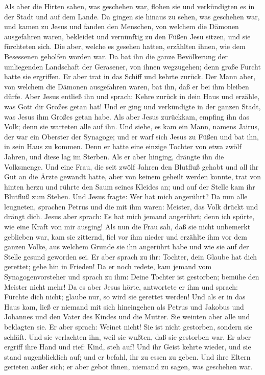  Als aber die Hirten sahen, was geschehen war, flohen sie
und verkündigten es in der Stadt und auf dem Lande.  Da
gingen sie hinaus zu sehen, was geschehen war, und kamen zu Jesus und
fanden den Menschen, von welchem die Dämonen ausgefahren waren,
bekleidet und vernünftig zu den Füßen Jesu sitzen, und sie fürchteten
sich.  Die aber, welche es gesehen hatten, erzählten
ihnen, wie dem Besessenen geholfen worden war.  Da bat
ihn die ganze Bevölkerung der umliegenden Landschaft der Gerasener, von
ihnen wegzugehen; denn große Furcht hatte sie ergriffen. Er aber trat in
das Schiff und kehrte zurück.  Der Mann aber, von welchem
die Dämonen ausgefahren waren, bat ihn, daß er bei ihm bleiben dürfe.
Aber Jesus entließ ihn und sprach:  Kehre zurück in dein
Haus und erzähle, was Gott dir Großes getan hat! Und er ging und
verkündigte in der ganzen Stadt, was Jesus ihm Großes getan habe.
 Als aber Jesus zurückkam, empfing ihn das Volk; denn sie
warteten alle auf ihn.  Und siehe, es kam ein Mann,
namens Jairus, der war ein Oberster der Synagoge; und er warf sich Jesus
zu Füßen und bat ihn, in sein Haus zu kommen.  Denn er
hatte eine einzige Tochter von etwa zwölf Jahren, und diese lag im
Sterben. Als er aber hinging, drängte ihn die Volksmenge.
 Und eine Frau, die seit zwölf Jahren den Blutfluß gehabt
und all ihr Gut an die Ärzte gewandt hatte, aber von keinem geheilt
werden konnte,  trat von hinten herzu und rührte den Saum
seines Kleides an; und auf der Stelle kam ihr Blutfluß zum Stehen.
 Und Jesus fragte: Wer hat mich angerührt? Da nun alle
leugneten, sprachen Petrus und die mit ihm waren: Meister, das Volk
drückt und drängt dich.  Jesus aber sprach: Es hat mich
jemand angerührt; denn ich spürte, wie eine Kraft von mir ausging!
 Als nun die Frau sah, daß sie nicht unbemerkt geblieben
war, kam sie zitternd, fiel vor ihm nieder und erzählte ihm vor dem
ganzen Volke, aus welchem Grunde sie ihn angerührt habe und wie sie auf
der Stelle gesund geworden sei.  Er aber sprach zu ihr:
Tochter, dein Glaube hat dich gerettet; gehe hin in Frieden!
 Da er noch redete, kam jemand vom Synagogenvorsteher und
sprach zu ihm: Deine Tochter ist gestorben; bemühe den Meister nicht
mehr!  Da es aber Jesus hörte, antwortete er ihm und
sprach: Fürchte dich nicht; glaube nur, so wird sie gerettet werden!
 Und als er in das Haus kam, ließ er niemand mit sich
hineingehen als Petrus und Jakobus und Johannes und den Vater des Kindes
und die Mutter.  Sie weinten aber alle und beklagten sie.
Er aber sprach: Weinet nicht! Sie ist nicht gestorben, sondern sie
schläft.  Und sie verlachten ihn, weil sie wußten, daß
sie gestorben war.  Er aber ergriff ihre Hand und rief:
Kind, steh auf!  Und ihr Geist kehrte wieder, und sie
stand augenblicklich auf; und er befahl, ihr zu essen zu geben.
 Und ihre Eltern gerieten außer sich; er aber gebot
ihnen, niemand zu sagen, was geschehen war.

